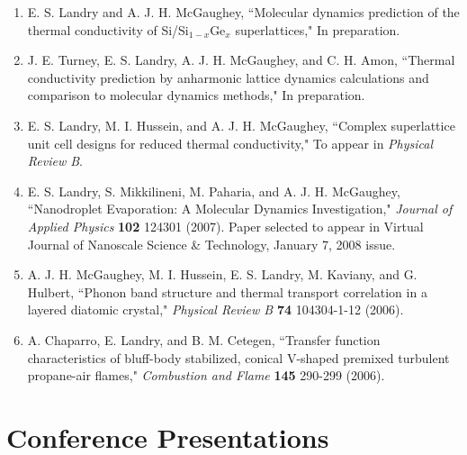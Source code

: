 \documentclass[letterpaper,12pt]{article}
\begin{document}
\begin{enumerate}

\item E. S. Landry and A. J. H. McGaughey, ``Molecular dynamics prediction of the thermal conductivity of Si/Si$_{1-x}$Ge$_x$ superlattices," In preparation.

\item J. E. Turney, E. S. Landry, A. J. H. McGaughey, and C. H. Amon, ``Thermal conductivity prediction by anharmonic lattice dynamics calculations and
comparison to molecular dynamics methods," In preparation.

\item E. S. Landry, M. I. Hussein, and A. J. H.
McGaughey, ``Complex superlattice unit cell designs for reduced
thermal conductivity," To appear in \textit{Physical Review B}.

\item E. S. Landry, S. Mikkilineni, M. Paharia, and A. J. H.
McGaughey, ``Nanodroplet Evaporation: A Molecular Dynamics
Investigation," \textit{Journal of Applied Physics} \textbf{102}
124301 (2007). Paper selected to appear in Virtual Journal of
Nanoscale Science \& Technology, January 7, 2008 issue.

\item A. J. H. McGaughey, M. I. Hussein, E. S. Landry, M. Kaviany, and
G. Hulbert, ``Phonon band structure and thermal transport
correlation in a layered diatomic crystal," \textit{Physical Review
B} \textbf{74} 104304-1-12 (2006).

\item A. Chaparro, E. Landry, and B. M. Cetegen, ``Transfer
function characteristics of bluff-body stabilized, conical V-shaped
premixed turbulent propane-air flames," \textit{Combustion and
Flame} \textbf{145} 290-299 (2006).

\end{enumerate}

\section*{Conference Presentations}
\end{document}
